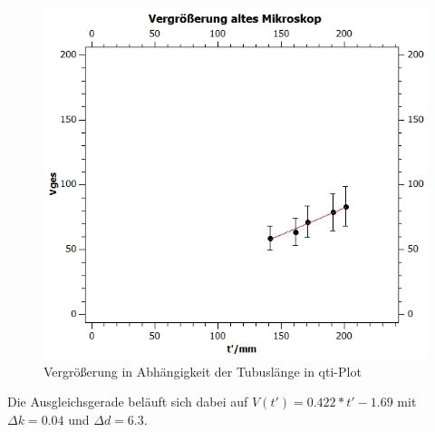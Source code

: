 \documentclass[12pt,a4paper,twoside]{article}
\begin{document}
\begin{figure}[H]
    \centering
    \includegraphics[width=0.6\linewidth, angle=0]{nudes/VergrößerungAltesMik.jpg}
    \caption{Vergrößerung in Abhängigkeit der Tubuslänge in qti-Plot}
    \label{fig:VergrößerungDiagramm}
\end{figure}

\noindent Die Ausgleichsgerade beläuft sich dabei auf $V(t') = 0.422*t' - 1.69$ mit $\Delta k = 0.04$ und $\Delta d = 6.3$.



\printbibliography[heading=bibintoc]
\end{document}
